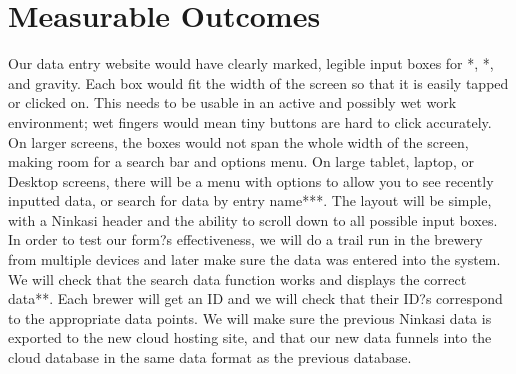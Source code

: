 \documentclass[draftclsnofoot, onecolumn, letterpaper, 10pt]{IEEEtran}
\begin{document}
\section{Measurable Outcomes}
Our data entry website would have clearly marked, legible input boxes for *, *, and gravity. Each box would fit the width of the screen so that it is easily tapped or clicked on. This needs to be usable in an active and possibly wet work environment; wet fingers would mean tiny buttons are hard to click accurately. On larger screens, the boxes would not span the whole width of the screen, making room for a search bar and options menu. On large tablet, laptop, or Desktop screens, there will be a menu with options to allow you to see recently inputted data, or search for data by entry name***. The layout will be simple, with a Ninkasi header and the ability to scroll down to all possible input boxes.  In order to test our form?s effectiveness, we will do a trail run in the brewery from multiple devices and later make sure the data was entered into the system. We will check that the search data function works and displays the correct data**. Each brewer will get an ID and we will check that their ID?s correspond to the appropriate data points. We will make sure the previous Ninkasi data is exported to the new cloud hosting site, and that our new data funnels into the cloud database in the same data format as the previous database. 
\end{document}
